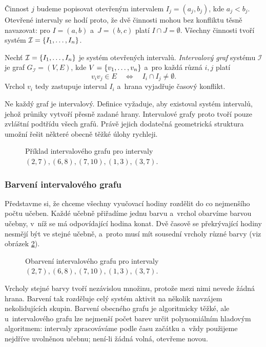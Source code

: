Činnost $j$ budeme popisovat otevřeným intervalem $I_j=(a_j,b_j)$, kde $a_j<b_j$. Otevřené intervaly se hodí proto, že dvě činnosti mohou bez konfliktu těsně navazovat: pro $I=(a,b)$ a~$J=(b,c)$ platí $I\cap J=\emptyset$. Všechny činnosti tvoří systém $\mathcal I=\left\{I_1,\dots,I_n\right\}$.

\begin{definition}\label{def:intervalovy-graf}
    Nechť $\mathcal I=\left\{I_1,\dots,I_n\right\}$ je systém otevřených intervalů. \emph{Intervalový graf} systému $\mathcal I$ je graf $G_{\mathcal I}=(V,E)$, kde $V=\left\{v_1,\dots,v_n\right\}$ a~pro každá různá $i,j$ platí
    \[
        v_iv_j\in E
        \quad\Longleftrightarrow\quad
        I_i\cap I_j\neq\emptyset.
    \]
    Vrchol $v_i$ tedy zastupuje interval $I_i$ a~hrana vyjadřuje časový konflikt.
\end{definition}

Ne každý graf je intervalový. Definice vyžaduje, aby existoval systém intervalů, jehož průniky vytvoří přesně zadané hrany. Intervalové grafy proto tvoří pouze zvláštní podtřídu všech grafů. Právě jejich dodatečná geometrická struktura umožní řešit některé obecně těžké úlohy rychleji.
\begin{figure}[ht]
    \centering
    
    \caption{Příklad intervalového grafu pro intervaly $(2,7),(6,8),(7,10),(1,3),(3,7)$.}
    \label{fig:int_graf}
\end{figure}
\subsubsection{Barvení intervalového grafu}

Představme si, že chceme všechny vyučovací hodiny rozdělit do co nejmenšího počtu učeben. Každé učebně přiřadíme jednu barvu a~vrchol obarvíme barvou učebny, v~níž se má odpovídající hodina konat. Dvě časově se překrývající hodiny nesmějí být ve stejné učebně, a~proto musí mít sousední vrcholy různé barvy (viz obrázek \ref{fig:int_graf2}).
\begin{figure}[ht]
    \centering
    
    \caption{Obarvení intervalového grafu pro intervaly $(2,7),(6,8),(7,10),(1,3),(3,7)$.}
    \label{fig:int_graf2}
\end{figure}
Vrcholy stejné barvy tvoří nezávislou množinu, protože mezi nimi nevede žádná hrana. Barvení tak rozděluje celý systém aktivit na několik navzájem nekolidujících skupin. Barvení obecného grafu je algoritmicky těžké, ale u~intervalového grafu lze nejmenší počet barev určit polynomiálním hladovým algoritmem: intervaly zpracováváme podle času začátku a~vždy použijeme nejdříve uvolněnou učebnu; není-li žádná volná, otevřeme novou.

